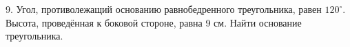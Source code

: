 9. Угол, противолежащий основанию равнобедренного треугольника, равен $120^\circ.$ Высота, проведённая к боковой стороне, равна 9 см. Найти основание треугольника.\\
